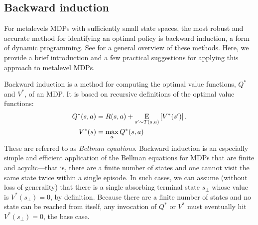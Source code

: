 \subsection{Backward induction}\label{sec:backinduct}

For metalevels MDPs with sufficiently small state spaces, the most robust and accurate method for identifying an optimal policy is backward induction, a form of dynamic programming. See \citet{puterman2014markov} for a general overview of these methods. Here, we provide a brief introduction and a few practical suggestions for applying this approach to metalevel MDPs.

Backward induction is a method for computing the optimal value functions, $Q^*$ and $V^*$, of an MDP. It is based on recursive definitions of the optimal value functions:
\begin{equation}\label{eq:value-recursive}
\begin{aligned}
    Q^*(s, a) &= R(s, a) + \expectunder{V^*(s')}{s' \sim T(s,a)}.\\
    V^*(s) &= \max_a Q^*(s, a)
\end{aligned}
\end{equation}
These are referred to as \emph{Bellman equations}. Backward induction is an especially simple and efficient application of the Bellman equations for MDPs that are finite and acyclic---that is, there are a finite number of states and one cannot visit the same state twice within a single episode. In such cases, we can assume (without loss of generality) that there is a single absorbing terminal state $s_\bot$ whose value is $V^*(s_\bot) = 0$, by definition. Because there are a finite number of states and no state can be reached from itself, any invocation of $Q^*$ or $V^*$ must eventually hit $V^*(s_\bot) = 0$, the base case.

